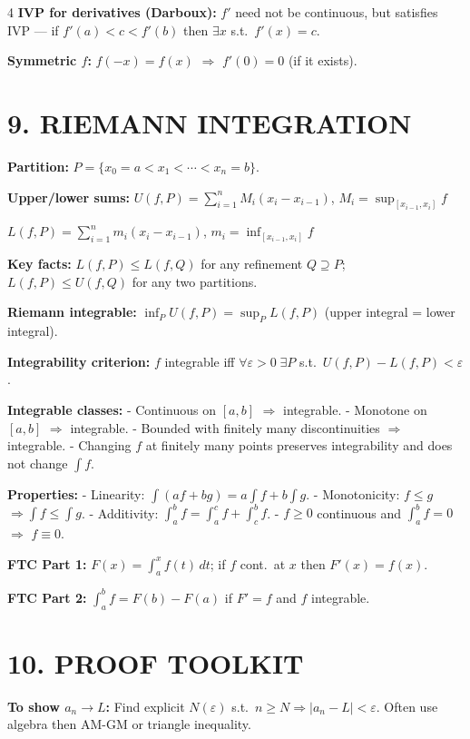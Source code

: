 \documentclass[8pt,a4paper,landscape]{extarticle}
\begin{document}
\begin{multicols}{4}
\textbf{IVP for derivatives (Darboux):} $f'$ need not be continuous, but satisfies IVP --- if $f'(a)<c<f'(b)$ then $\exists x$ s.t.\ $f'(x)=c$.

\textbf{Symmetric $f$:} $f(-x)=f(x)$ $\Rightarrow$ $f'(0)=0$ (if it exists).

\section*{9. RIEMANN INTEGRATION}

\textbf{Partition:} $P=\{x_0=a<x_1<\cdots<x_n=b\}$.

\textbf{Upper/lower sums:}
$U(f,P)=\sum_{i=1}^n M_i(x_i-x_{i-1})$, $M_i=\sup_{[x_{i-1},x_i]}f$

$L(f,P)=\sum_{i=1}^n m_i(x_i-x_{i-1})$, $m_i=\inf_{[x_{i-1},x_i]}f$

\textbf{Key facts:} $L(f,P)\leq L(f,Q)$ for any refinement $Q\supseteq P$; $L(f,P)\leq U(f,Q)$ for any two partitions.

\textbf{Riemann integrable:} $\inf_P U(f,P)=\sup_P L(f,P)$ (upper integral = lower integral).

\textbf{Integrability criterion:} $f$ integrable iff $\forall\varepsilon>0\;\exists P$ s.t.\ $U(f,P)-L(f,P)<\varepsilon$.

\textbf{Integrable classes:}
- Continuous on $[a,b]$ $\Rightarrow$ integrable.
- Monotone on $[a,b]$ $\Rightarrow$ integrable.
- Bounded with finitely many discontinuities $\Rightarrow$ integrable.
- Changing $f$ at finitely many points preserves integrability and does not change $\int f$.

\textbf{Properties:}
- Linearity: $\int(af+bg)=a\int f+b\int g$.
- Monotonicity: $f\leq g$ $\Rightarrow\int f\leq\int g$.
- Additivity: $\int_a^b f=\int_a^c f+\int_c^b f$.
- $f\geq0$ continuous and $\int_a^b f=0$ $\Rightarrow$ $f\equiv0$.

\textbf{FTC Part 1:} $F(x)=\int_a^x f(t)\,dt$; if $f$ cont.\ at $x$ then $F'(x)=f(x)$.

\textbf{FTC Part 2:} $\int_a^b f=F(b)-F(a)$ if $F'=f$ and $f$ integrable.

\section*{10. PROOF TOOLKIT}

\textbf{To show $a_n\to L$:} Find explicit $N(\varepsilon)$ s.t.\ $n\geq N\Rightarrow|a_n-L|<\varepsilon$. Often use algebra then AM-GM or triangle inequality.


\end{multicols}
\end{document}

